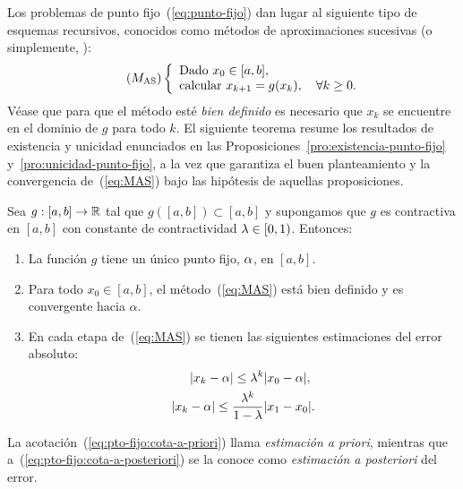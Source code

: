 Los problemas de punto fijo~(\ref{eq:punto-fijo}) dan lugar al
siguiente tipo de esquemas recursivos, conocidos como métodos de
aproximaciones sucesivas (o simplemente, ):
\begin{equation}
  \tag{$M_{\text{AS}}$}
  \left\{
    \begin{array}{l}
    \text{Dado } x_0\in [a,b], \\
    \text{calcular } x_{k+1}=g(x_k), \quad \forall k\ge 0.
    \end{array}
  \right.
  \label{eq:MAS}
\end{equation}
Véase que para que el método esté \textit{bien definido} es necesario
que $x_k$ se encuentre en el dominio de $g$ para todo $k$.
El siguiente teorema resume los resultados de existencia y unicidad
enunciados en las Proposiciones~\ref{pro:existencia-punto-fijo}
y~\ref{pro:unicidad-punto-fijo}, a la vez que garantiza el buen
planteamiento y la convergencia de~(\ref{eq:MAS}) bajo las hipótesis
de aquellas proposiciones.

\begin{theorem}
  \label{thm:punto-fijo-Banach}
  Sea $g:[a,b]\to\operatorname{{\mathbb R}}$ tal que $g([a,b]) \subset [a,b]$ y supongamos
  que $g$ es contractiva en $[a,b]$ con constante de contractividad
  $\lambda\in [0,1)$. Entonces:
  \begin{enumerate}
  \item
    \label{item:punto-fijo-Banach:1}
    La función $g$ tiene un \textsf{único punto fijo}, $\alpha$, en
    $[a,b]$.
  \item
    \label{item:punto-fijo-Banach:2}
    Para todo $x_0\in [a,b]$, el método~(\ref{eq:MAS}) está bien
    definido y es \textsf{convergente} hacia $\alpha$.
  \item En cada etapa de~(\ref{eq:MAS}) se tienen las siguientes
    \textsf{estimaciones} del error absoluto:
    \label{item:punto-fijo-Banach:3}
    \begin{align}
      \label{eq:pto-fijo:cota-a-priori}
      |x_k-\alpha| \le \lambda^k &|x_0-\alpha|,
      \\
      \label{eq:pto-fijo:cota-a-posteriori}
      |x_k-\alpha| \le \frac{\lambda^k}{1-\lambda}
                                     &|x_1-x_0|.
    \end{align}
  \end{enumerate}
\end{theorem}

La acotación~(\ref{eq:pto-fijo:cota-a-priori}) llama
\textit{estimación a priori}, mientras que
a~(\ref{eq:pto-fijo:cota-a-posteriori}) se la conoce como
\textit{estimación a posteriori} del error.

